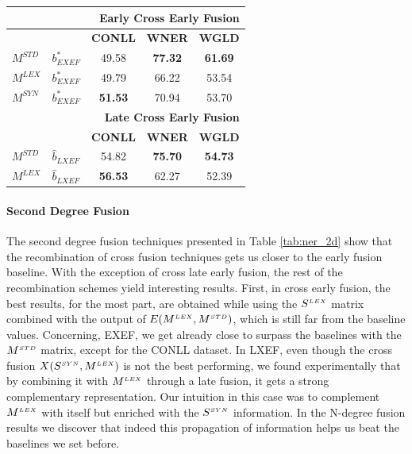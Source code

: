 \begin{table}[t]
\begin{tabular}{@{}llccc@{}}
	                         &                & \multicolumn{3}{r}{\textbf{Early Cross Early Fusion}} \\ \midrule
	                         &                & \textbf{CONLL} & \textbf{WNER}  &             \textbf{WGLD}             \\
	\cmidrule{3-5}
$M^{\scriptscriptstyle STD}$ & $b^*_{\scriptscriptstyle EXEF}$          & 49.58 & \textbf{77.32} &            \textbf{61.69}             \\
	$M^{\scriptscriptstyle LEX}$                & $b^*_{\scriptscriptstyle EXEF}$      & 49.79 & 66.22 &            53.54             \\
	$M^{\scriptscriptstyle SYN}$                & $b^*_{\scriptscriptstyle EXEF}$           & \textbf{51.53} & 70.94 &            53.70             \\ \midrule
	                         &                & \multicolumn{3}{r}{\textbf{Late Cross Early Fusion}}  \\ \midrule
	                         &                & \textbf{CONLL} & \textbf{WNER}  &             \textbf{WGLD}             \\
	\cmidrule{3-5}
$M^{\scriptscriptstyle STD}$ &$\hat{b}_{\scriptscriptstyle LXEF}$           &  54.82   & \textbf{75.70} &            \textbf{54.73}             \\
	$M^{\scriptscriptstyle LEX}$                & $\hat{b}_{\scriptscriptstyle LXEF}$  & \textbf{56.53} & 62.27 &            52.39             \\ \bottomrule
\end{tabular}
\end{table}
           
\paragraph{Second Degree Fusion} 
The second degree fusion techniques presented in Table \ref{tab:ner_2d} show that the recombination of cross fusion techniques gets us closer to the early fusion baseline. With the exception of cross late early fusion, the rest of the recombination schemes yield interesting results. First, in cross early fusion, the best results, for the most part, are obtained while using the $S^{\scriptscriptstyle LEX}$ matrix combined with the output of $E(M^{\scriptscriptstyle LEX}, M^{\scriptscriptstyle STD})$, which is still far from the baseline values. Concerning, EXEF, we get already close to surpass the baselines with the $M^{\scriptscriptstyle STD}$ matrix, except for the CONLL dataset. In LXEF, even though the cross fusion $X(S^{\scriptscriptstyle SYN}, M^{\scriptscriptstyle LEX})$ is not the best performing, we found experimentally that by combining it with $M^{\scriptscriptstyle LEX}$ through a late fusion, it gets  a strong complementary representation. Our intuition in this case was to complement $M^{\scriptscriptstyle LEX}$ with itself but enriched with the $S^{\scriptscriptstyle SYN}$ information. In the N-degree fusion results we discover that indeed this propagation of information helps us beat the baselines we set before.
